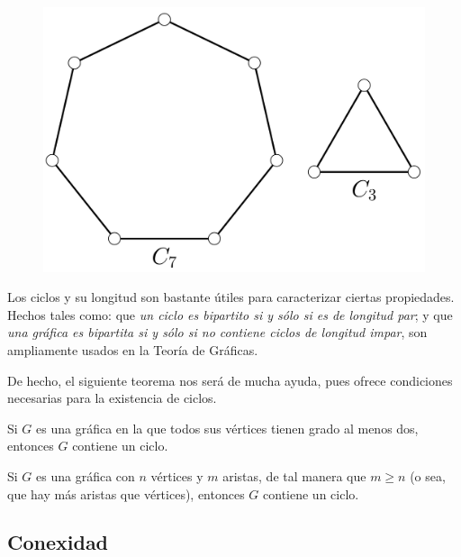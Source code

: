 \begin{figure}[h]
    \centering
    \includegraphics[scale=0.15]{img/imgchapter1/Ciclos.jpg}
    \caption{}
    \label{fig:ciclos}
\end{figure}

Los ciclos y su longitud son bastante útiles para caracterizar ciertas propiedades. Hechos tales como: que \textit{un ciclo es bipartito si y sólo si es de longitud par}; y que \textit{una gráfica es bipartita si y sólo si no contiene ciclos de longitud impar}, son ampliamente usados en la Teoría de Gráficas.

De hecho, el siguiente teorema nos será de mucha ayuda, pues ofrece condiciones necesarias para la existencia de ciclos.

\begin{teo} \label{teo:ciclos}  
Si $G$ es una gráfica en la que todos sus vértices tienen grado al menos dos, entonces $G$ contiene un ciclo.
\end{teo}

\begin{teo}
Si $G$ es una gráfica con $n$ vértices y $m$ aristas, de tal manera que $m \geq n$ (o sea, que hay más aristas que vértices), entonces $G$ contiene un ciclo.
\end{teo}


\subsection{Conexidad} \label{sec:conexidad}
 
